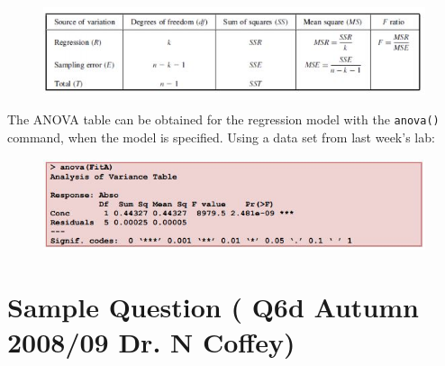 \documentclass[a4paper,12pt]{article}
\begin{document}
\newpage
\begin{figure}[h!]
\centering
\includegraphics[width=1.1\linewidth]{images/RegressionANOVA-table}

\end{figure}

The ANOVA table can be obtained for the regression model with the \texttt{anova()
	} command, when the
model is specified. Using a data set from last week’s lab:
\begin{figure}[h!]
\centering
\includegraphics[width=1.2\linewidth]{images/RegressionANOVA-Rcode}

\end{figure}

\newpage
\section{Sample Question ( Q6d Autumn 2008/09 Dr. N Coffey)}
\end{document}
